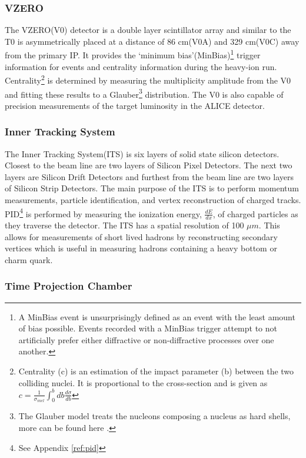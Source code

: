 \subsubsection{VZERO}
The VZERO(V0)\cite{Abbas:2013taa} detector is a double layer scintillator array and similar to the T0 is asymmetrically placed at a distance of 86 cm(V0A) and 329 cm(V0C) away from the primary IP.  It provides the `minimum bias'(MinBias)\footnote{A MinBias event is unsurprisingly defined as an event with the least amount of bias possible.  Events recorded with a MinBias trigger  attempt to not artificially prefer either diffractive or non-diffractive processes over one another\cite{Field:2011iq}.} trigger information for events and centrality information during the heavy-ion run.   Centrality\footnote{Centrality (c) is an estimation of the impact parameter (b) between the two colliding nuclei.  It is proportional to the cross-section and is given as $c = \frac{1}{\sigma_{inel}} \int^{b}_{0} db \frac{d\sigma}{db}$} is determined by measuring the multiplicity amplitude from the V0 and fitting these results to a Glauber\footnote{The Glauber model treats the nucleons composing a nucleus as hard shells, more can be found here \cite{Loizides:2016djv}.} distribution.  The V0 is also capable of precision measurements of the target luminosity in the ALICE detector.


\subsubsection{Inner Tracking System}\label{sec:its}
The Inner Tracking System(ITS)\cite{BEOLE20121062} is six layers of solid state silicon detectors.  Closest to the beam line are two layers of Silicon Pixel Detectors.  The next two layers are Silicon Drift Detectors and furthest from the beam line are two layers of Silicon Strip Detectors.  The main purpose of the ITS is to perform momentum measurements, particle identification, and vertex reconstruction of charged tracks.  PID\footnote{See Appendix \ref{ref:pid}} is performed by measuring the ionization energy, $\frac{dE}{dx}$, of charged particles as they traverse the detector\cite{Adam:2016acv}.  The ITS has a spatial resolution of 100 $\mu m$.  This allows for measurements of short lived hadrons by reconstructing secondary vertices which is useful in measuring hadrons containing a heavy bottom or charm quark.



\subsubsection{Time Projection Chamber}\label{sec:tpc}

